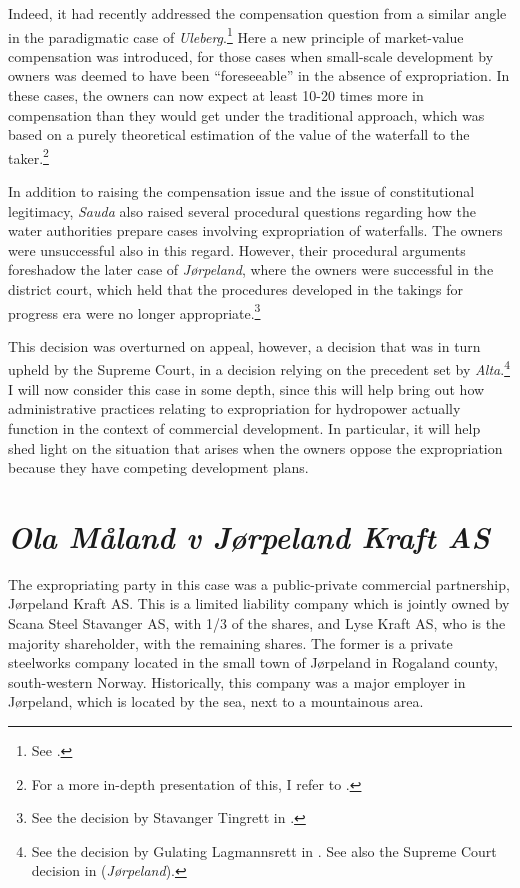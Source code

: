 Indeed, it had recently addressed the compensation question from a similar angle in the paradigmatic case of {\it Uleberg}.\footnote{See \cite{uleberg08}.} Here a new principle of market-value compensation was introduced, for those cases when small-scale development by owners was deemed to have been ``foreseeable'' in the absence of expropriation. In these cases, the owners can now expect at least 10-20 times more in compensation than they would get under the traditional approach, which was based on a purely theoretical estimation of the value of the waterfall to the taker.\footnote{For a more in-depth presentation of this, I refer to \cite[71-76]{dyrkolbotn15}.}

In addition to raising the compensation issue and the issue of constitutional legitimacy, {\it Sauda} also raised several procedural questions regarding how the water authorities prepare cases involving expropriation of waterfalls. The owners were unsuccessful also in this regard. However, their procedural arguments foreshadow the later case of {\it Jørpeland}, where the owners were successful in the district court, which held that the procedures developed in the takings for progress era were no longer appropriate.\footnote{See the decision by Stavanger Tingrett in \cite{jorpeland09}.} 

This decision was overturned on appeal, however, a decision that was in turn upheld by the Supreme Court, in a decision relying on the precedent set by {\it Alta}.\footnote{See the decision by Gulating Lagmannsrett in \cite{jorpeland11a}. See also the Supreme Court decision in \cite{jorpeland11} ({\it Jørpeland}).}  I will now consider this case in some depth, since this will help bring out how administrative practices relating to expropriation for hydropower actually function in the context of commercial development. In particular, it will help shed light on the situation that arises when the owners oppose the expropriation because they have competing development plans.

\section{{\it Ola Måland v Jørpeland Kraft AS}}\label{sec:jorpeland}

The expropriating party in this case was a public-private commercial partnership, Jørpeland Kraft AS. This is a limited liability company which is jointly owned by Scana Steel Stavanger AS, with 1/3 of the shares, and Lyse Kraft AS, who is the majority shareholder, with the remaining shares. The former is a private steelworks company located in the small town of Jørpeland in Rogaland county, south-western Norway. Historically, this company was a major employer in Jørpeland, which is located by the sea, next to a mountainous area.


